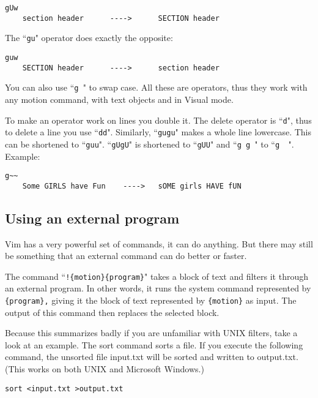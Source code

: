 \begin{Verbatim}[samepage=true]
                         gUw
    section header      ---->      SECTION header
\end{Verbatim}

The ``\texttt{gu}" operator does exactly the opposite:

\begin{Verbatim}[samepage=true]
                         guw
    SECTION header      ---->      section header
\end{Verbatim}

You can also use ``\texttt{g~}" to swap case.
All these are operators, thus they work with any motion command, with text objects and in Visual mode.

To make an operator work on lines you double it.
The delete operator is ``\texttt{d}", thus to delete a line you use ``\texttt{dd}".
Similarly, ``\texttt{gugu}" makes a whole line lowercase.
This can be shortened to ``\texttt{guu}".
``\texttt{gUgU}" is shortened to ``\texttt{gUU}" and ``\texttt{g~g~}" to ``\texttt{g~~}".
Example:

\begin{Verbatim}[samepage=true]
                            g~~
    Some GIRLS have Fun    ---->   sOME girls HAVE fUN
\end{Verbatim}
\subsection{Using an external program}
Vim has a very powerful set of commands, it can do anything.
But there may still be something that an external command can do better or faster.

The command ``\texttt{!\{motion\}\{program\}}" takes a block of text and filters it through an external program.
In other words, it runs the system command represented by \texttt{\{program\},} giving it the block of text represented by \texttt{\{motion\}} as input.
The output of this command then replaces the selected block.

Because this summarizes badly if you are unfamiliar with UNIX filters, take a look at an example.
The sort command sorts a file.
If you execute the following command, the unsorted file input.txt will be sorted and written to output.txt.
(This works on both UNIX and Microsoft Windows.)

\begin{Verbatim}[samepage=true]
 sort <input.txt >output.txt
\end{Verbatim}

